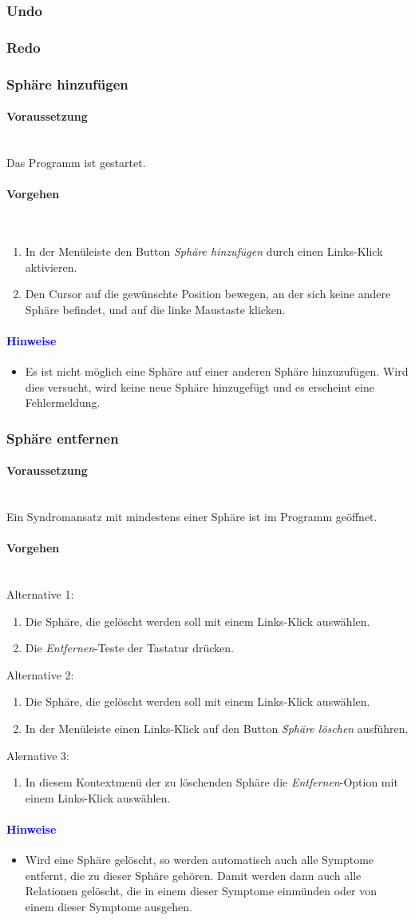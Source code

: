 \documentclass[enabledeprecatedfontcommands,fontsize=11pt,paper=a4,twoside]{scrartcl}
\newcounter{one}
\newcommand*{\hint}{\paragraph{\textcolor{blue}{Hinweise}}}
\newcommand*{\condition}{\paragraph{Voraussetzung}$\;$ \vspace{0.2cm}\\}
\newcommand*{\actions}{\paragraph{Vorgehen} $\;$\vspace{0.2cm}\\}
\begin{document}
		\subsubsection{Undo}
		\subsubsection{Redo}
		\subsubsection{Sphäre hinzufügen}	
		\condition 	
		Das Programm ist gestartet.
		\actions
		\begin{enumerate}
			\item In der Menüleiste den Button \textit{Sphäre hinzufügen} durch einen Links-Klick aktivieren.
			\item Den Cursor auf die gewünschte Position bewegen, an der sich keine andere Sphäre befindet, und auf die linke Maustaste klicken.
		\end{enumerate}
		\hint
		\begin{itemize}
			\item Es ist nicht möglich eine Sphäre auf einer anderen Sphäre hinzuzufügen. Wird dies versucht, wird keine neue Sphäre hinzugefügt und es erscheint eine Fehlermeldung.
	\end{itemize}
		\subsubsection{Sphäre entfernen}
			\condition 	
		Ein Syndromansatz mit mindestens einer Sphäre ist im Programm geöffnet. 
		\actions  
		Alternative 1:
		\begin{enumerate}
			\item Die Sphäre, die gelöscht werden soll mit einem Links-Klick auswählen.
			\item Die \textit{Entfernen}-Teste der Tastatur drücken.
		\end{enumerate}
		Alternative 2:
			\begin{enumerate}
			\item Die Sphäre, die gelöscht werden soll mit einem Links-Klick auswählen.
			\item In der Menüleiste einen Links-Klick auf den Button \textit{Sphäre löschen} ausführen.
		\end{enumerate}
		Alernative 3:
		\begin{enumerate} 
			\item In diesem Kontextmenü der zu löschenden Sphäre die \textit{Entfernen}-Option mit einem Links-Klick auswählen.
		\end{enumerate}
		\hint
		\begin{itemize}
			\item Wird eine Sphäre gelöscht, so werden automatisch auch alle Symptome entfernt, die zu dieser Sphäre gehören. Damit werden dann auch alle Relationen gelöscht, die in einem dieser Symptome einmünden oder von einem dieser Symptome ausgehen.
		\end{itemize}
\end{document}
